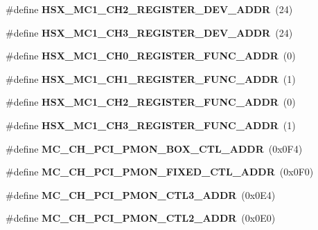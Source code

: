\begin{DoxyCompactItemize}
\item 
\#define {\bfseries H\+S\+X\+\_\+\+M\+C1\+\_\+\+C\+H2\+\_\+\+R\+E\+G\+I\+S\+T\+E\+R\+\_\+\+D\+E\+V\+\_\+\+A\+D\+D\+R}~(24)\label{types_8h_aa125c331d375c1164ae6a616eec31014}

\item 
\#define {\bfseries H\+S\+X\+\_\+\+M\+C1\+\_\+\+C\+H3\+\_\+\+R\+E\+G\+I\+S\+T\+E\+R\+\_\+\+D\+E\+V\+\_\+\+A\+D\+D\+R}~(24)\label{types_8h_a2ef6fa583fd69484b2128c682554cfab}

\item 
\#define {\bfseries H\+S\+X\+\_\+\+M\+C1\+\_\+\+C\+H0\+\_\+\+R\+E\+G\+I\+S\+T\+E\+R\+\_\+\+F\+U\+N\+C\+\_\+\+A\+D\+D\+R}~(0)\label{types_8h_a9e00a2ce3e8556188d647e194d81a060}

\item 
\#define {\bfseries H\+S\+X\+\_\+\+M\+C1\+\_\+\+C\+H1\+\_\+\+R\+E\+G\+I\+S\+T\+E\+R\+\_\+\+F\+U\+N\+C\+\_\+\+A\+D\+D\+R}~(1)\label{types_8h_aee9cd6ca3ced8a3c153636089964b1c4}

\item 
\#define {\bfseries H\+S\+X\+\_\+\+M\+C1\+\_\+\+C\+H2\+\_\+\+R\+E\+G\+I\+S\+T\+E\+R\+\_\+\+F\+U\+N\+C\+\_\+\+A\+D\+D\+R}~(0)\label{types_8h_a632f2964790894881ba99d35b115a597}

\item 
\#define {\bfseries H\+S\+X\+\_\+\+M\+C1\+\_\+\+C\+H3\+\_\+\+R\+E\+G\+I\+S\+T\+E\+R\+\_\+\+F\+U\+N\+C\+\_\+\+A\+D\+D\+R}~(1)\label{types_8h_a55266623de7c9f6adf4ad9a97f7412a6}

\item 
\#define {\bfseries M\+C\+\_\+\+C\+H\+\_\+\+P\+C\+I\+\_\+\+P\+M\+O\+N\+\_\+\+B\+O\+X\+\_\+\+C\+T\+L\+\_\+\+A\+D\+D\+R}~(0x0\+F4)\label{types_8h_aea8596ef216183dc024d55d149b0cdb8}

\item 
\#define {\bfseries M\+C\+\_\+\+C\+H\+\_\+\+P\+C\+I\+\_\+\+P\+M\+O\+N\+\_\+\+F\+I\+X\+E\+D\+\_\+\+C\+T\+L\+\_\+\+A\+D\+D\+R}~(0x0\+F0)\label{types_8h_ac2bc96a812f71daf9b6eccaa96c8e0f3}

\item 
\#define {\bfseries M\+C\+\_\+\+C\+H\+\_\+\+P\+C\+I\+\_\+\+P\+M\+O\+N\+\_\+\+C\+T\+L3\+\_\+\+A\+D\+D\+R}~(0x0\+E4)\label{types_8h_ad8114150630d7b263604680573973e19}

\item 
\#define {\bfseries M\+C\+\_\+\+C\+H\+\_\+\+P\+C\+I\+\_\+\+P\+M\+O\+N\+\_\+\+C\+T\+L2\+\_\+\+A\+D\+D\+R}~(0x0\+E0)\label{types_8h_a34160d3d7833e5085905fac476b7b3d7}


\end{DoxyCompactItemize}
